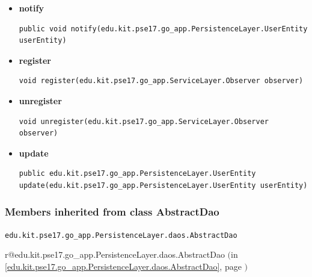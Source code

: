 \documentclass[11pt,a4paper]{report}
\makeatletter
\newcommand{\refdefined}[1]{
\expandafter\ifx\csname r@#1\endcsname\relax
\relax\else
{$($in \ref{#1}, page \pageref{#1}$)$}\fi}
\makeatother
\begin{document}
{{{{{{{{{{{{{{{{{\begin{itemize}
{
\hypertarget{edu.kit.pse17.go_app.PersistenceLayer.daos.UserDaoImp.getUserByEmail(java.lang.String)}{{\bf  getUserByEmail}\\}
\begin{lstlisting}[frame=none]
edu.kit.pse17.go_app.PersistenceLayer.UserEntity getUserByEmail(java.lang.String mail)\end{lstlisting} %
}%
\item{ 
\hypertarget{edu.kit.pse17.go_app.PersistenceLayer.daos.UserDaoImp.notify(edu.kit.pse17.go_app.PersistenceLayer.UserEntity)}{{\bf  notify}\\}
\begin{lstlisting}[frame=none]
public void notify(edu.kit.pse17.go_app.PersistenceLayer.UserEntity userEntity)\end{lstlisting} %
}%
\item{ 
\hypertarget{edu.kit.pse17.go_app.PersistenceLayer.daos.UserDaoImp.register(edu.kit.pse17.go_app.ServiceLayer.Observer)}{{\bf  register}\\}
\begin{lstlisting}[frame=none]
void register(edu.kit.pse17.go_app.ServiceLayer.Observer observer)\end{lstlisting} %
}%
\item{ 
\hypertarget{edu.kit.pse17.go_app.PersistenceLayer.daos.UserDaoImp.unregister(edu.kit.pse17.go_app.ServiceLayer.Observer)}{{\bf  unregister}\\}
\begin{lstlisting}[frame=none]
void unregister(edu.kit.pse17.go_app.ServiceLayer.Observer observer)\end{lstlisting} %
}%
\item{ 
\hypertarget{edu.kit.pse17.go_app.PersistenceLayer.daos.UserDaoImp.update(edu.kit.pse17.go_app.PersistenceLayer.UserEntity)}{{\bf  update}\\}
\begin{lstlisting}[frame=none]
public edu.kit.pse17.go_app.PersistenceLayer.UserEntity update(edu.kit.pse17.go_app.PersistenceLayer.UserEntity userEntity)\end{lstlisting} %
}%
\end{itemize}
}
\subsubsection{Members inherited from class AbstractDao }{
\texttt{edu.kit.pse17.go_app.PersistenceLayer.daos.AbstractDao} {\small 
\refdefined{edu.kit.pse17.go_app.PersistenceLayer.daos.AbstractDao}}
{\small 

}}}}}}}}}}}}}}}}}}
\end{document}
